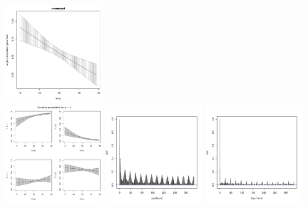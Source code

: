 \documentclass[12pt]{article}\usepackage[]{graphicx}\usepackage[]{color}
\begin{document}
\begin{figure}[htbp]
  \includegraphics[width=0.32\textwidth]{plot_elephantResults010.pdf} \\
  \includegraphics[width=0.32\textwidth]{plot_elephantResults013.pdf}
  \includegraphics[width=0.32\textwidth]{plot_elephantResults017.pdf}
  \includegraphics[width=0.32\textwidth]{plot_elephantResults016.pdf} \\

\end{figure}
\end{document}
